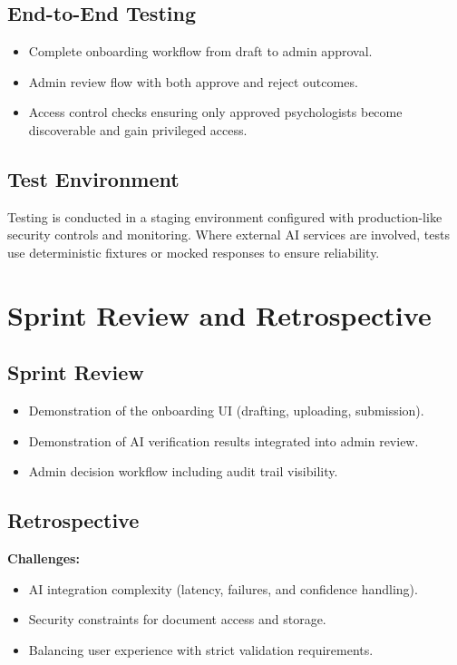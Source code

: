 \subsection{End-to-End Testing}
\begin{itemize}
    \item Complete onboarding workflow from draft to admin approval.
    \item Admin review flow with both approve and reject outcomes.
    \item Access control checks ensuring only approved psychologists become
    discoverable and gain privileged access.
\end{itemize}

\subsection{Test Environment}
Testing is conducted in a staging environment configured with production-like
security controls and monitoring. Where external AI services are involved,
tests use deterministic fixtures or mocked responses to ensure reliability.

\section{Sprint Review and Retrospective}
\label{sec:sprint2-review}

\subsection{Sprint Review}
\begin{itemize}
    \item Demonstration of the onboarding UI (drafting, uploading, submission).
    \item Demonstration of AI verification results integrated into admin review.
    \item Admin decision workflow including audit trail visibility.
\end{itemize}

\subsection{Retrospective}
\textbf{Challenges:}
\begin{itemize}
    \item AI integration complexity (latency, failures, and confidence handling).
    \item Security constraints for document access and storage.
    \item Balancing user experience with strict validation requirements.
\end{itemize}

